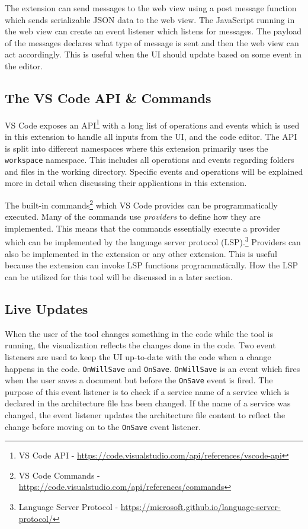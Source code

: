 The extension can send messages to the web view using a post message function which sends serializable JSON data to the web view.
The JavaScript running in the web view can create an event listener which listens for messages. The payload of the messages declares what type of message is sent and then the web view can act accordingly.
This is useful when the UI should update based on some event in the editor.


\subsection{The VS Code API \& Commands}
VS Code exposes an API\footnote{VS Code API - \url{https://code.visualstudio.com/api/references/vscode-api}} with a long list of operations and events
which is used in this extension to handle all inputs from the UI, and the code editor.
The API is split into different namespaces where this extension primarily uses the \texttt{workspace}
namespace. This includes all operations and events regarding folders and files in the working directory.
Specific events and operations will be explained more in detail when discussing their applications in this extension.

The built-in commands\footnote{VS Code Commands - \url{https://code.visualstudio.com/api/references/commands}} which VS Code provides can be programmatically executed.
Many of the commands use \textit{providers} to define how they are implemented. This means that the commands essentially execute a provider which can be implemented by the language server protocol (LSP).\footnote{Language Server Protocol - \url{https://microsoft.github.io/language-server-protocol/}}
Providers can also be implemented in the extension or any other extension.
This is useful because the extension can invoke LSP functions programmatically. How the LSP can be utilized for this tool will be discussed in a later section.

\subsection{Live Updates}
When the user of the tool changes something in the code while the tool is running, the visualization reflects the changes done in the code.
Two event listeners are used to keep the UI up-to-date with the code when a change happens in the code. \texttt{OnWillSave} and \texttt{OnSave}.
\texttt{OnWillSave} is an event which fires when the user saves a document but before the \texttt{OnSave} event is fired. The purpose of this event listener is
to check if a service name of a service which is declared in the architecture file has been changed. If the name of a service was changed, the event listener updates the architecture file content to reflect the change before moving on to the \texttt{OnSave} event listener.

